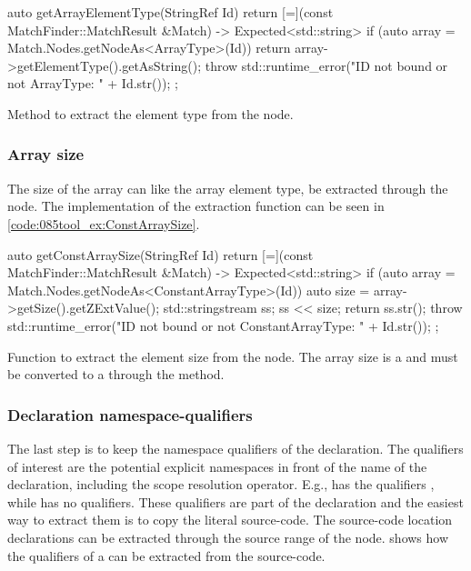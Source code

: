 \begin{listing}[H]
    \begin{cppcode}
auto getArrayElementType(StringRef Id) {
    return [=](const MatchFinder::MatchResult &Match) -> Expected<std::string> {
        if (auto array = Match.Nodes.getNodeAs<ArrayType>(Id)) {
            return array->getElementType().getAsString();
        }
        throw std::runtime_error("ID not bound or not ArrayType: " + Id.str());
    };
}
    \end{cppcode}
    \caption{Method to extract the element type from the  node.}
    \label{code:085tool_ex:ArrayElemtType}
\end{listing}

\subsubsection*{Array size}

The size of the array can like the array element type, be extracted through the  node. The implementation of the extraction function can be seen in \cref{code:085tool_ex:ConstArraySize}.

\begin{listing}[H]
    \begin{cppcode}
auto getConstArraySize(StringRef Id) {
    return [=](const MatchFinder::MatchResult &Match) -> Expected<std::string> {
        if (auto array = Match.Nodes.getNodeAs<ConstantArrayType>(Id)) {
            auto size = array->getSize().getZExtValue();
            std::stringstream ss;
            ss << size;
            return ss.str();
        }
        throw std::runtime_error("ID not bound or not ConstantArrayType: " + Id.str());
    };
}
    \end{cppcode}
    \caption{Function to extract the element size from the  node. The array size is a  and must be converted to a  through the  method.}
    \label{code:085tool_ex:ConstArraySize}
\end{listing}

\subsubsection*{Declaration namespace-qualifiers}

The last step is to keep the namespace qualifiers of the declaration. The qualifiers of interest are the potential explicit namespaces in front of the name of the declaration, including the scope resolution operator. E.g.,  has the qualifiers , while  has no qualifiers.
These qualifiers are part of the declaration and the easiest way to extract them is to copy the literal source-code. The source-code location declarations can be extracted through the source range of the node.  shows how the qualifiers of a  can be extracted from the source-code.

